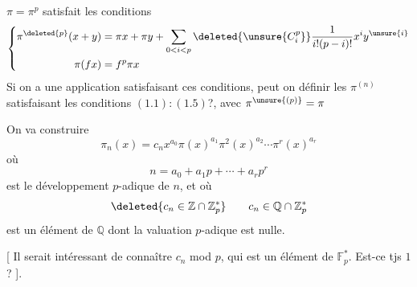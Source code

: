 $\pi=\pi^p$ satisfait les conditions
\[
\left\{\begin{aligned}
\pi^{\deleted{p}}(x+y)&=\pi x+\pi y+\sum_{0<i<p}\deleted{\unsure{C_i^p}}\frac{1}{i!(p-i)!}x^iy^{\unsure{i}}\\
\pi(fx)&=f^p\pi x
\end{aligned}\right.
\]
Si on a une application satisfaisant ces conditions, peut on définir les $\pi^{(n)}$  satisfaisant les conditions   $(1.1):(1.5)$?, avec $\pi^{\unsure{(p)}}=\pi$


On va construire
\[
\pi_n(x)=c_nx^{a_0}\pi(x)^{a_1}\pi^2(x)^{a_2}\cdots\pi^r(x)^{a_r}
\]
où
\[
n=a_0+a_1p+\cdots+a_rp^r
\]
est le développement $p$-adique de $n$, et où 
\[
\deleted{c_n\in\mathbb Z\cap\mathbb Z_p^*}\qquad c_n\in\mathbb Q\cap\mathbb Z_p^*
\]
est un élément de $\mathbb Q$ dont la valuation $p$-adique est nulle.

[ Il serait intéressant de connaître $c_n$ mod $p$, qui est un élément de $\mathbb F_p^*$. Est-ce tjs $1$? ].

